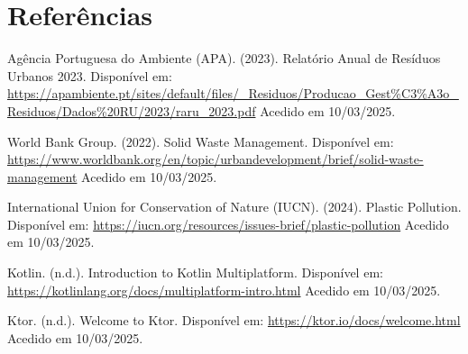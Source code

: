 \documentclass[a4paper,11pt]{article}
\begin{document}
\section{Referências} 
\begin{thebibliography}{9}

 Agência Portuguesa do Ambiente (APA). (2023). Relatório Anual de Resíduos Urbanos 2023. Disponível em: \url{https://apambiente.pt/sites/default/files/_Residuos/Producao_Gest%C3%A3o_Residuos/Dados%20RU/2023/raru_2023.pdf} Acedido em 10/03/2025.

 World Bank Group. (2022). Solid Waste Management. Disponível em: \url{https://www.worldbank.org/en/topic/urbandevelopment/brief/solid-waste-management} Acedido em 10/03/2025.

 International Union for Conservation of Nature (IUCN). (2024). Plastic Pollution. Disponível em: \url{https://iucn.org/resources/issues-brief/plastic-pollution} Acedido em 10/03/2025.

 Kotlin. (n.d.). Introduction to Kotlin Multiplatform. Disponível em: \url{https://kotlinlang.org/docs/multiplatform-intro.html} Acedido em 10/03/2025.

 Ktor. (n.d.). Welcome to Ktor. Disponível em: \url{https://ktor.io/docs/welcome.html} Acedido em 10/03/2025.

\end{thebibliography}
\end{document}

